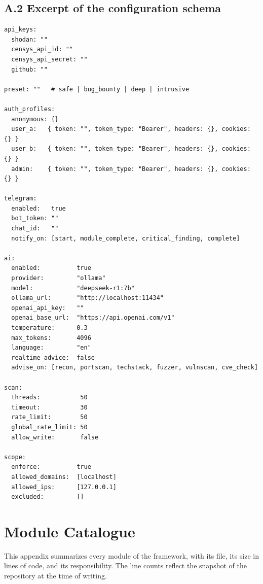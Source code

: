 \section*{A.2 Excerpt of the configuration schema}

\begin{lstlisting}[basicstyle=\ttfamily\footnotesize,caption={Excerpt of \texttt{config.yaml.example} showing the most important sections.}]
api_keys:
  shodan: ""
  censys_api_id: ""
  censys_api_secret: ""
  github: ""

preset: ""   # safe | bug_bounty | deep | intrusive

auth_profiles:
  anonymous: {}
  user_a:   { token: "", token_type: "Bearer", headers: {}, cookies: {} }
  user_b:   { token: "", token_type: "Bearer", headers: {}, cookies: {} }
  admin:    { token: "", token_type: "Bearer", headers: {}, cookies: {} }

telegram:
  enabled:   true
  bot_token: ""
  chat_id:   ""
  notify_on: [start, module_complete, critical_finding, complete]

ai:
  enabled:          true
  provider:         "ollama"
  model:            "deepseek-r1:7b"
  ollama_url:       "http://localhost:11434"
  openai_api_key:   ""
  openai_base_url:  "https://api.openai.com/v1"
  temperature:      0.3
  max_tokens:       4096
  language:         "en"
  realtime_advice:  false
  advise_on: [recon, portscan, techstack, fuzzer, vulnscan, cve_check]

scan:
  threads:           50
  timeout:           30
  rate_limit:        50
  global_rate_limit: 50
  allow_write:       false

scope:
  enforce:          true
  allowed_domains:  [localhost]
  allowed_ips:      [127.0.0.1]
  excluded:         []
\end{lstlisting}

\chapter{Module Catalogue}

This appendix summarizes every module of the framework, with its file, its size in lines of code, and its responsibility. The line counts reflect the snapshot of the repository at the time of writing.

